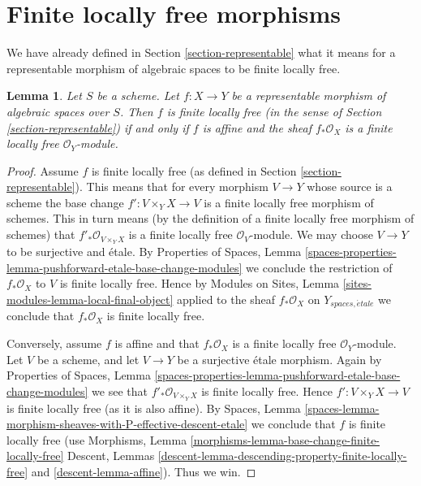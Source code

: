 \documentclass{stacks-project}
\theoremstyle{plain}
\newtheorem{lemma}[subsection]{Lemma}
\theoremstyle{definition}
\theoremstyle{remark}
\numberwithin{equation}{subsection}
\def\etale{{\acute{e}tale}}
\begin{document}
\section{Finite locally free morphisms}
\label{section-finite-locally-free}

\noindent
We have already defined in Section \ref{section-representable}
what it means for a representable morphism of algebraic spaces
to be finite locally free.

\begin{lemma}
\label{lemma-finite-locally-free-representable}
Let $S$ be a scheme. Let $f : X \to Y$ be a representable morphism
of algebraic spaces over $S$. Then $f$ is finite locally free
(in the sense of Section \ref{section-representable})
if and only if $f$ is affine and the sheaf $f_*\mathcal{O}_X$ is
a finite locally free $\mathcal{O}_Y$-module.
\end{lemma}

\begin{proof}
Assume $f$ is finite locally free (as defined in
Section \ref{section-representable}). This means that
for every morphism $V \to Y$ whose source is a scheme the
base change $f' : V \times_Y X \to V$ is a finite locally free morphism
of schemes. This in turn means (by the definition of a finite locally
free morphism of schemes) that
$f'_*\mathcal{O}_{V \times_Y X}$
is a finite locally free $\mathcal{O}_V$-module. We may choose $V \to Y$
to be surjective and \'etale. By
Properties of Spaces,
Lemma \ref{spaces-properties-lemma-pushforward-etale-base-change-modules}
we conclude the restriction of $f_*\mathcal{O}_X$ to $V$ is
finite locally free. Hence by
Modules on Sites, Lemma \ref{sites-modules-lemma-local-final-object}
applied to the sheaf $f_*\mathcal{O}_X$ on $Y_{spaces, \etale}$
we conclude that $f_*\mathcal{O}_X$ is finite locally free.

\medskip\noindent
Conversely, assume $f$ is affine and that $f_*\mathcal{O}_X$ is a finite
locally free $\mathcal{O}_Y$-module. Let $V$ be a scheme, and let
$V \to Y$ be a surjective \'etale morphism. Again by
Properties of Spaces,
Lemma \ref{spaces-properties-lemma-pushforward-etale-base-change-modules}
we see that $f'_*\mathcal{O}_{V \times_Y X}$ is finite locally free.
Hence $f' : V \times_Y X \to V$ is finite locally free (as it is also affine).
By
Spaces,
Lemma \ref{spaces-lemma-morphism-sheaves-with-P-effective-descent-etale}
we conclude that $f$ is finite locally free (use
Morphisms, Lemma \ref{morphisms-lemma-base-change-finite-locally-free}
Descent, Lemmas \ref{descent-lemma-descending-property-finite-locally-free}
and \ref{descent-lemma-affine}). Thus we win.
\end{proof}
\end{document}
